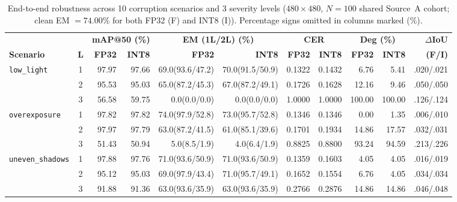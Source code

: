 \documentclass[pdflatex,sn-mathphys-num]{sn-jnl}
\begin{document}
\begin{table}[t]
\centering
\caption{End-to-end robustness across 10 corruption scenarios and 3 severity levels ($480\times 480$, $N=100$ shared Source~A cohort; clean EM $= 74.00\%$ for both FP32 (F) and INT8 (I)). Percentage signs omitted in columns marked (\%).}\label{tab:robustness_full}
{\fontsize{5.6pt}{6.8pt}\selectfont\setlength{\tabcolsep}{1.1pt}
\begin{tabular}{@{}lc@{\hspace{3.5pt}}rr@{\hspace{3.5pt}}rr@{\hspace{3.5pt}}rr@{\hspace{3.5pt}}rr@{\hspace{3.5pt}}r@{}}
\toprule
 & & \multicolumn{2}{c}{\textbf{mAP@50 (\%)}} & \multicolumn{2}{c}{\textbf{EM (1L/2L) (\%)}} & \multicolumn{2}{c}{\textbf{CER}} & \multicolumn{2}{c}{\textbf{Deg (\%)}} & \textbf{$\Delta$IoU} \\
\cmidrule(lr){3-4} \cmidrule(lr){5-6} \cmidrule(lr){7-8} \cmidrule(lr){9-10}
\textbf{Scenario} & \textbf{L} & \textbf{FP32} & \textbf{INT8} & \textbf{FP32} & \textbf{INT8} & \textbf{FP32} & \textbf{INT8} & \textbf{FP32} & \textbf{INT8} & \textbf{(F/I)} \\
\midrule
\multirow{3}{*}{\texttt{low\_light}} & 1 & 97.97 & 97.66 & 69.0(93.6/47.2) & 70.0(91.5/50.9) & 0.1322 & 0.1432 & 6.76 & 5.41 & .020/.021 \\
 & 2 & 95.53 & 95.03 & 65.0(87.2/45.3) & 67.0(87.2/49.1) & 0.1726 & 0.1628 & 12.16 & 9.46 & .050/.050 \\
 & 3 & 56.58 & 59.75 & 0.0(0.0/0.0) & 0.0(0.0/0.0) & 1.0000 & 1.0000 & 100.00 & 100.00 & .126/.124 \\
\midrule
\multirow{3}{*}{\texttt{overexposure}} & 1 & 97.82 & 97.82 & 74.0(97.9/52.8) & 73.0(95.7/52.8) & 0.1346 & 0.1346 & 0.00 & 1.35 & .006/.010 \\
 & 2 & 97.97 & 97.79 & 63.0(87.2/41.5) & 61.0(85.1/39.6) & 0.1701 & 0.1934 & 14.86 & 17.57 & .032/.031 \\
 & 3 & 51.43 & 50.94 & 5.0(8.5/1.9) & 4.0(6.4/1.9) & 0.8825 & 0.8800 & 93.24 & 94.59 & .213/.226 \\
\midrule
\multirow{3}{*}{\texttt{uneven\_shadows}} & 1 & 97.88 & 97.76 & 71.0(93.6/50.9) & 71.0(93.6/50.9) & 0.1359 & 0.1603 & 4.05 & 4.05 & .016/.019 \\
 & 2 & 95.12 & 95.03 & 69.0(97.9/43.4) & 71.0(95.7/49.1) & 0.1652 & 0.1554 & 6.76 & 4.05 & .034/.034 \\
 & 3 & 91.88 & 91.36 & 63.0(93.6/35.9) & 63.0(93.6/35.9) & 0.2766 & 0.2876 & 14.86 & 14.86 & .046/.048 \\

\end{tabular}}
\end{table}
\end{document}
